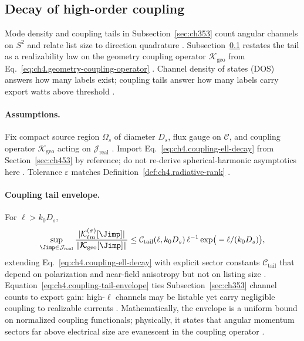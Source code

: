 \subsection{Decay of high-order coupling}
\label{sec:ch463}

Mode density and coupling tails in Subsection~\ref{sec:ch353} count angular channels on \(S^{2}\) and relate list size to direction
quadrature \cite{jackson1999,hansen1988,stratton1941}. Subsection~\ref{sec:ch463} restates the tail as a realizability law on the
geometry coupling operator \(\boldsymbol{\mathcal{K}}_{\mathrm{geo}}\) from Eq.~\eqref{eq:ch4.geometry-coupling-operator}
\cite{harrington2001,devaney2004}. Channel density of states (DOS) answers how many labels exist; coupling tails answer how many labels
carry export watts above threshold \cite{hansen1988,collin2001}.

\paragraph{Assumptions.}
Fix compact source region \(\Omega_{s}\) of diameter \(D_{s}\), flux gauge on \(\mathcal{C}\), and coupling operator
\(\boldsymbol{\mathcal{K}}_{\mathrm{geo}}\) acting on \(\mathcal{J}_{\mathrm{real}}\) \cite{stratton1941,hansen1988}. Import
Eq.~\eqref{eq:ch4.coupling-ell-decay} from Section~\ref{sec:ch453} by reference; do not re-derive spherical-harmonic asymptotics here
\cite{harrington2001,devaney2004,jackson1999}. Tolerance \(\varepsilon\) matches Definition~\ref{def:ch4.radiative-rank}
\cite{hansen1988}.

\paragraph{Coupling tail envelope.}
For \(\ell>k_{0}D_{s}\),
\begin{equation}
\label{eq:ch4.coupling-tail-envelope}
\sup_{\Jimp\in\mathcal{J}_{\mathrm{real}}}
\frac{|\mathcal{K}_{\ell m}^{(\sigma)}[\Jimp]|}{\|\boldsymbol{\mathcal{K}}_{\mathrm{geo}}[\Jimp]\|}
\le
\mathcal{C}_{\mathrm{tail}}(\ell,k_{0}D_{s})\,
\ell^{-1}\exp\!\big(-\ell/(k_{0}D_{s})\big),
\end{equation}
extending Eq.~\eqref{eq:ch4.coupling-ell-decay} with explicit sector constants \(\mathcal{C}_{\mathrm{tail}}\) that depend on
polarization and near-field anisotropy but not on listing size \cite{hansen1988,stratton1941,jackson1999}. Equation~\eqref{eq:ch4.coupling-tail-envelope}
ties Subsection~\ref{sec:ch353} channel counts to export gain: high-\(\ell\) channels may be listable yet carry negligible coupling to
realizable currents \cite{harrington2001,devaney2004,collin2001}. Mathematically, the envelope is a uniform bound on normalized coupling
functionals; physically, it states that angular momentum sectors far above electrical size are evanescent in the coupling operator
\cite{jackson1999,hansen1988,stratton1941}.

